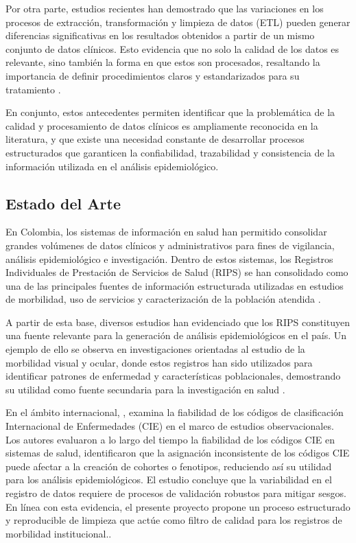 \documentclass[12pt, letterpaper, oneside]{article}
\begin{document}
Por otra parte, estudios recientes han demostrado que las variaciones en los procesos de extracción, transformación y limpieza de datos (ETL) pueden generar diferencias significativas en los resultados obtenidos a partir de un mismo conjunto de datos clínicos. Esto evidencia que no solo la calidad de los datos es relevante, sino también la forma en que estos son procesados, resaltando la importancia de definir procedimientos claros y estandarizados para su tratamiento \parencite{essen_implications_2025}.

En conjunto, estos antecedentes permiten identificar que la problemática de la calidad y procesamiento de datos clínicos es ampliamente reconocida en la literatura, y que existe una necesidad constante de desarrollar procesos estructurados que garanticen la confiabilidad, trazabilidad y consistencia de la información utilizada en el análisis epidemiológico.

\subsection{Estado del Arte}

En Colombia, los sistemas de información en salud han permitido consolidar grandes volúmenes de datos clínicos y administrativos para fines de vigilancia, análisis epidemiológico e investigación. Dentro de estos sistemas, los Registros Individuales de Prestación de Servicios de Salud (RIPS) se han consolidado como una de las principales fuentes de información estructurada utilizadas en estudios de morbilidad, uso de servicios y caracterización de la población atendida \parencite{rosselli_sispro_2022}.

A partir de esta base, diversos estudios han evidenciado que los RIPS constituyen una fuente relevante para la generación de análisis epidemiológicos en el país. Un ejemplo de ello se observa en investigaciones orientadas al estudio de la morbilidad visual y ocular, donde estos registros han sido utilizados para identificar patrones de enfermedad y características poblacionales, demostrando su utilidad como fuente secundaria para la investigación en salud \parencite{medrano_caracterizacion_2015}.

En el ámbito internacional, \textcite{nelson_are_2024}, examina la fiabilidad de los códigos de clasificación Internacional de Enfermedades (CIE) en el marco de estudios observacionales. Los autores evaluaron a lo largo del tiempo la fiabilidad de los códigos CIE en sistemas de salud, identificaron que la asignación inconsistente de los códigos CIE puede afectar a la creación de cohortes o fenotipos, reduciendo así su utilidad para los análisis epidemiológicos. El estudio concluye que la variabilidad en el registro de datos requiere de procesos de validación robustos para mitigar sesgos. En línea con esta evidencia, el presente proyecto propone un proceso estructurado y reproducible de limpieza que actúe como filtro de calidad para los registros de morbilidad institucional..
\end{document}
